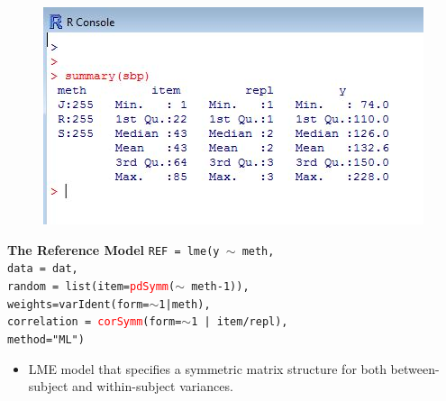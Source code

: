 \documentclass[compress]{beamer}        %
\makeatletter
\newcommand{\tcb}{\textcolor{beamer@blendedblue}}
\newcommand{\tcr}{\textcolor{red}}
\makeatother
\begin{document}
\begin{frame}
	\begin{figure}
\centering
\includegraphics[width=0.9\linewidth]{images/sbpsummary}

\end{figure}

\end{frame}
		\begin{frame}[fragile]{\bf \tcb{The Reference Model}}
			\texttt{REF = lme(y $\sim$ meth,\\
				\hspace{0.6cm} data = dat,\\
				\hspace{0.6cm} random = list(item=\tcr{pdSymm}($\sim$ meth-1)), \\
				\hspace{0.6cm} weights=varIdent(form=$\sim$1|meth),\\
				\hspace{0.6cm} correlation = \tcr{corSymm}(form=$\sim$1 | item/repl),\\
				\hspace{0.6cm} method="ML")}\\
			\begin{itemize}
				\item LME model that specifies a symmetric matrix structure for both between-subject and within-subject variances.
			\end{itemize}
			
		\end{frame}
		
\end{document}

